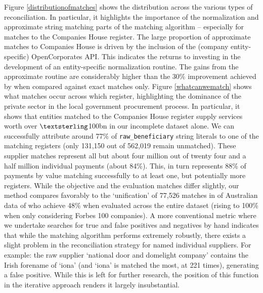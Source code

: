 \documentclass[12pt]{article}
\begin{document}
Figure \ref{distributionofmatches} shows the distribution across the various types of reconciliation. In particular, it highlights the importance of the normalization and approximate string matching parts of the matching algorithm -- especially for matches to the Companies House register. The large proportion of approximate matches to Companies House is driven by the inclusion of the (company entity-specific) OpenCorporates API. This indicates the returns to investing in the development of an entity-specific normalization routine. The gains from the approximate routine are considerably higher than the 30\% improvement achieved by \cite{imai2017} when compared against exact matches only. Figure \ref{whatcanwematch} shows what matches occur across which register, highlighting the dominance of the private sector in the local government procurement process. In particular, it shows that entities matched to the Companies House register supply services worth over $\textsterling$100bn in our incomplete dataset alone.  We can successfully attribute around 77\% of \texttt{raw\_beneficiary} string literals to one of the matching registers (only 131,150 out of 562,019 remain unmatched). These supplier matches represent all but about four million out of twenty four and a half million individual payments (about 84\%). This, in turn represents 88\% of payments by value matching successfully to at least one, but potentially more registers. While the objective and the evaluation matches differ slightly, our method compares favorably to the `unification' of 77,526 matches in of Australian data of  \cite{corfu2015} who achieve 48\% when evaluated across the entire dataset (rising to 100\% when only considering Forbes 100 companies). A more conventional metric where we undertake searches for true and false positives and negatives by hand indicates that while the matching algorithm performs extremely robustly, there exists a slight problem in the reconciliation strategy for named individual suppliers. For example: the raw supplier `national door and domelight company' contains the Irish forename of `iona' (and `iona' is matched the most, at 221 times), generating a false positive. While this is left for further research, the position of this function in the iterative approach renders it largely insubstantial.
\end{document}

